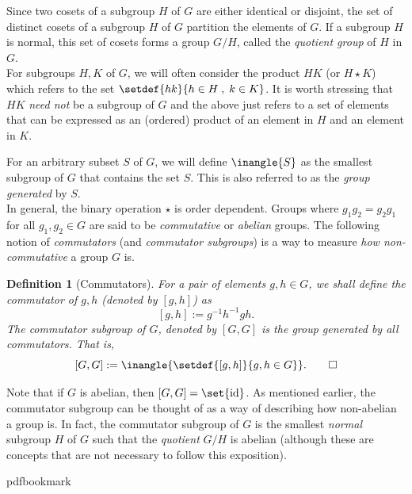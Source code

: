 \documentclass[11pt]{article}
\newtheorem{definition}[theorem]{Definition}
\begin{document}
Since two cosets of a subgroup $H$ of $G$ are either identical or
disjoint, the set of distinct cosets of a subgroup $H$ of $G$
partition the elements of $G$. If a subgroup $H$ is normal, this set
of cosets forms a group $G/H$, called the \emph{quotient group} of $H$
in $G$.\\


%
For subgroups $H, K$ %
of $G$, we will often consider the product $HK$ (or $H \star K$) which refers to the set $\setdef{h k}{h \in H\;,\; k\in K}$. 
It is worth stressing that $HK$ \emph{need not} be a subgroup of $G$ and the above just refers to a set of elements that can be expressed as an (ordered) product of an element in $H$ and an element in $K$. 

For an arbitrary %
subset  %
$S$ of $G$, we will define $\inangle{S}$ as the smallest subgroup of $G$ that contains the set $S$. This is also referred to as the \emph{group generated} by $S$.\\


In general, the binary operation $\star$ is order dependent. Groups where $g_1 g_2 = g_2 g_1$ for all $g_1,g_2 \in G$ are said to be \emph{commutative} or \emph{abelian} groups. The following notion of \emph{commutators} (and \emph{commutator subgroups}) is a way to measure \emph{how non-commutative} a group $G$ is.

\begin{definition}[Commutators]\label{defn:commutator}
  For a pair of elements $g, h\in G$, we shall define the \emph{commutator} of $g,h$ (denoted by $[g,h]$) as
  \[
    [g,h] := g^{-1} h^{-1} g h. 
  \]
  The \emph{commutator subgroup} of $G$, denoted by $[G,G]$ is the \emph{group generated by all commutators}. That is,
  \[
    [G,G] := \inangle{\setdef{[g,h]}{g,h\in G}}.\qedhere
  \]
\end{definition}

Note that if $G$ is abelian, then $[G,G] = \set{\mathrm{id}}$. As mentioned earlier, the commutator subgroup can be thought of as a way of describing how non-abelian a group is. In fact, the commutator subgroup of $G$ is the smallest \emph{normal} subgroup $H$ of $G$ such that the \emph{quotient} $G/H$ is abelian (although these are concepts that are not necessary to follow this exposition).



\newcommand{\prelim}{Preliminary version in\ }\newcommand{\prelims}{Preliminary
  versions in\ }\newcommand{\sortsilent}[1]{}
\providecommand{\bibhead}[1]{}
\expandafter\ifx\csname pdfbookmark\endcsname\relax%
  \providecommand{\tocrefpdfbookmark}{}
\else\providecommand{\tocrefpdfbookmark}{%
   \hypertarget{tocreferences}{}%
   \pdfbookmark[1]{References}{tocreferences}}%
\fi
\end{document}

